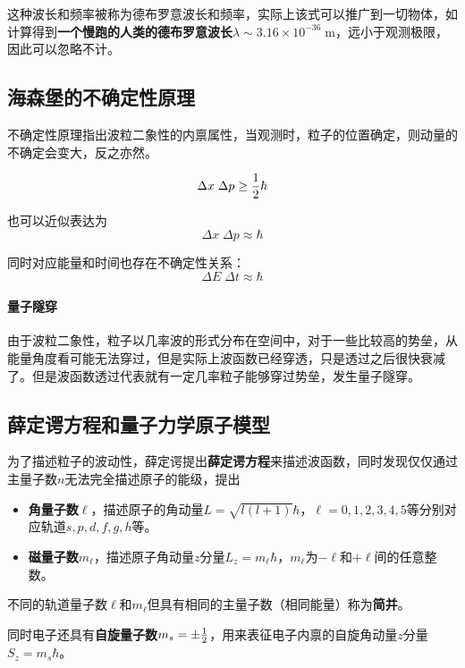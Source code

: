 这种波长和频率被称为德布罗意波长和频率，实际上该式可以推广到一切物体，如计算得到\textbf{一个慢跑的人类的德布罗意波长}$\lambda\sim3.16\times10^{-36}\;\mathrm m$，远小于观测极限，因此可以忽略不计。

\subsection{海森堡的不确定性原理}\label{uncertainty}
不确定性原理指出波粒二象性的内禀属性，当观测时，粒子的位置确定，则动量的不确定会变大，反之亦然。

\begin{equation}
  \Delta x \;\Delta p\geq{1\over2}\hbar
\end{equation}

也可以近似表达为
\begin{equation}
  \Delta x \;\Delta p\approx \hbar
\end{equation}

同时对应能量和时间也存在不确定性关系：
\begin{equation}
  \Delta E \;\Delta t\approx \hbar
\end{equation}

\paragraph{量子隧穿}
由于波粒二象性，粒子以几率波的形式分布在空间中，对于一些比较高的势垒，从能量角度看可能无法穿过，但是实际上波函数已经穿透，只是透过之后很快衰减了。但是波函数透过代表就有一定几率粒子能够穿过势垒，发生量子隧穿。

\subsection{薛定谔方程和量子力学原子模型}
为了描述粒子的波动性，薛定谔提出\textbf{薛定谔方程}来描述波函数，同时发现仅仅通过主量子数$n$无法完全描述原子的能级，提出
\begin{itemize}
  \item \textbf{角量子数}$\ell$，描述原子的角动量$L=\sqrt{l(l+1)}\hbar$，$\ell=0,1,2,3,4,5$等分别对应轨道$s,p,d,f,g,h$等。
  \item \textbf{磁量子数}$m_\ell$，描述原子角动量$z$分量$L_z=m_\ell \hbar$，$m_\ell$为$-\ell$和$+\ell$间的任意整数。
\end{itemize}

不同的轨道量子数$\ell$和$m_\ell$但具有相同的主量子数（相同能量）称为\textbf{简并}。

同时电子还具有\textbf{自旋量子数}$m_s=\pm{1\over2}$，用来表征电子内禀的自旋角动量$z$分量$S_z=m_s \hbar$。

